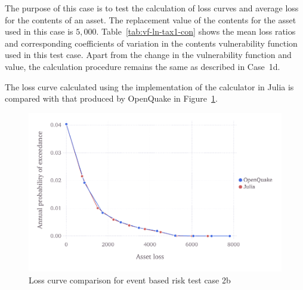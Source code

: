 The purpose of this case is to test the calculation of loss curves and average loss for the contents of an asset. The replacement value of the contents for the asset used in this case is $5,000$. Table~\ref{tab:vf-ln-tax1-con} shows the mean loss ratios and corresponding coefficients of variation in the contents vulnerability function used in this test case. Apart from the change in the vulnerability function and value, the calculation procedure remains the same as described in Case~1d.

The loss curve calculated using the implementation of the calculator in Julia is compared with that produced by OpenQuake in Figure~\ref{fig:lc-ebr-2b}.

\begin{figure}[htbp]
\centering
\includegraphics[width=12cm]{qareport/figures/fig-lc-ebr-2b}
\caption{Loss curve comparison for event based risk test case 2b}
\label{fig:lc-ebr-2b}
\end{figure}